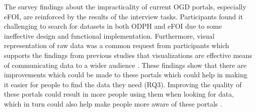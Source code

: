 \documentclass{sigchi}
\begin{document}
The survey findings about the impracticality of current OGD portals, especially eFOI, are reinforced by the results of the interview tasks. Participants found it challenging to search for datasets in both ODPH and eFOI due to some ineffective design and functional implementation. Furthermore, visual representation of raw data was a common request from participants which supports the findings from previous studies that visualizations are effective means of communicating data to a wider audience \cite{Erete2016}. These findings show that there are improvements which could be made to these portals which could help in making it easier for people to find the data they need (RQ3). Improving the quality of these portals could result in more people using them when looking for data, which in turn could also help make people more aware of these portals \cite{corrales2019knowledge}.


\end{document}
